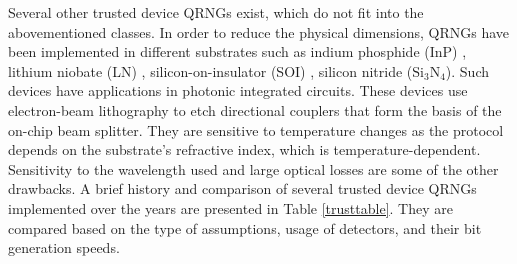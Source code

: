 \documentclass[]{interact}
\theoremstyle{plain}%
\theoremstyle{definition}
\theoremstyle{remark}
\begin{document}
Several other trusted device QRNGs exist, which do not fit into the abovementioned classes. In order to reduce the physical dimensions, QRNGs have been implemented in different substrates such as  indium phosphide (InP) \cite{abellan2016quantum}, lithium niobate (LN) \cite{haylock2019multiplexed}, silicon-on-insulator (SOI) \cite{prokhodtsov2020silicon}, silicon
nitride ($\text{Si}_3\text{N}_4$). Such devices have applications in photonic integrated circuits. These devices use electron-beam lithography to etch directional couplers that form the basis of the on-chip beam splitter. They are sensitive to temperature changes as the protocol depends on the substrate's refractive index, which is temperature-dependent. Sensitivity to the wavelength used and large optical losses are some of the other drawbacks. A brief history and comparison of several trusted device QRNGs implemented over the years are presented in Table \ref{trusttable}. They are compared based on the type of assumptions, usage of detectors, and their bit generation speeds.
\end{document}
